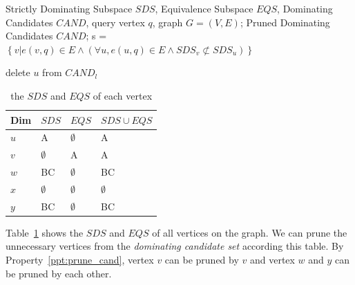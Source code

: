 \begin{algorithm}[H]
  \caption{1-hop Pruning}
  \label{algo:pruning_graph}
  \begin{algorithmic}[1]
  \show\LOOP
    \REQUIRE Strictly Dominating Subspace $\mathit{SDS}$, Equivalence Subspace $\mathit{EQS}$, Dominating Candidates $\mathit{CAND}$, query vertex $q$, graph $G=(V, E)$;
    \ENSURE Pruned Dominating Candidates $\mathit{CAND}$;
    \STATE s = $\left\{v|e(v, q) \in E \wedge (\forall u, e(u, q) \in E \wedge SDS_v \not\subset SDS_u)\right\}$
    
                    \STATE delete $u$ from $\mathit{CAND}_l$
                \ENDIF
                
            \ENDFOR
        \ENDFOR
    \ENDFOR
  \end{algorithmic}
\end{algorithm}

\begin{table}[h]
    \centering
    \begin{tabular}{|l|l|l|l|}
    \hline
    Dim & $SDS$       & $EQS$       & $SDS \cup EQS$ \\ \hline
    $u$ & A           & $\emptyset$ & A              \\ \hline
    $v$ & $\emptyset$ & A           & A              \\ \hline
    $w$ & BC          & $\emptyset$ & BC             \\ \hline
    $x$ & $\emptyset$ & $\emptyset$ & $\emptyset$    \\ \hline
    $y$ & BC          & $\emptyset$ & BC             \\ \hline
    \end{tabular}
    \caption{\label{tab:SDS_EQS}the $SDS$ and $EQS$ of each vertex}
    
\end{table}

Table~\ref{tab:SDS_EQS} shows the $SDS$ and $EQS$ of all vertices on the graph. We can prune the unnecessary vertices from the \emph{dominating candidate set} according this table. By Property~\ref{ppt:prune_cand}, vertex $v$ can be pruned by $v$ and vertex $w$ and $y$ can be pruned by each other.


